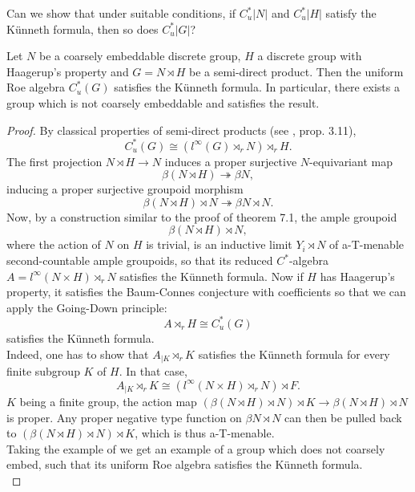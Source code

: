 Can we show that under suitable conditions, if $C^*_u|N|$ and $C^*_u|H|$ satisfy the K\"{u}nneth formula, then so does $C^*_u|G|$?  \\

\begin{prop}
Let $N$ be a coarsely embeddable discrete group, $H$ a discrete group with Haagerup's property and $G = N\rtimes H$ be a semi-direct product. Then the uniform Roe algebra $C^*_u(G)$ satisfies the K\"unneth formula. In particular, there exists a group which is not coarsely embeddable and satisfies the result. 
\end{prop}

\begin{proof}
By classical properties of semi-direct products (see \cite{williams2007crossed}, prop. 3.11),
\[C^*_u(G)  \cong (l^\infty(G)\rtimes_r N)\rtimes_r H.\]
The first projection $N\rtimes H\rightarrow N$ induces a proper surjective $N$-equivariant map 
\[\beta ( N\rtimes H ) \twoheadrightarrow \beta N,\] 
inducing a proper surjective groupoid morphism  
\[\beta ( N\rtimes H )\rtimes N \twoheadrightarrow \beta N \rtimes N.\] 
Now, by a construction similar to the proof of theorem 7.1, the ample groupoid \[\beta(N\rtimes H) \rtimes N,\] where the action of $N$ on $H$ is trivial, is an inductive limit $Y_i\rtimes N$ of a-T-menable second-countable ample groupoids, so that its reduced $C^*$-algebra $A=l^\infty(N\times H)\rtimes_r N$ satisfies the K\"unneth formula. Now if $H$ has Haagerup's property, it satisfies the Baum-Connes conjecture with coefficients so that we can apply the Going-Down principle: 
\[A\rtimes_r H \cong C^*_u(G)\] satisfies the K\"unneth formula. \\%

Indeed, one has to show that $A_{|K}\rtimes_r K$ satisfies the K\"unneth formula for every finite subgroup $K$ of $H$. In that case,
\[A_{|K}\rtimes_r K \cong (l^\infty(N\times H)\rtimes_r N)\rtimes F.\]
$K$ being a finite group, the action map $(\beta ( N\rtimes H )\rtimes N)\rtimes K \rightarrow \beta (N\rtimes H ) \rtimes N$ is proper. Any proper negative type function on $\beta N \rtimes N$ can then be pulled back to $(\beta ( N\rtimes H )\rtimes N)\rtimes K$, which is thus a-T-menable.\\ 

Taking the example of \cite{arzhantseva2016admitting} we get an example of a group which does not coarsely embed, such that its uniform Roe algebra satisfies the K\"unneth formula.\\
\end{proof}

